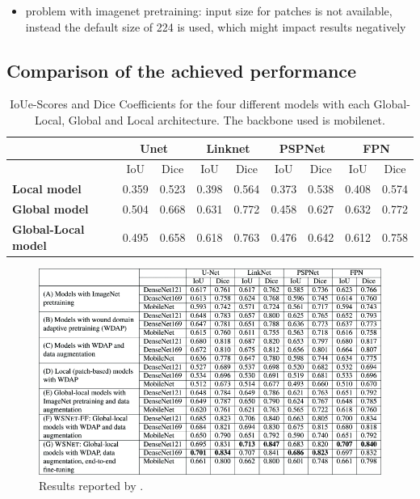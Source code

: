 \begin{itemize}
	\item problem with imagenet pretraining: input size for patches is not available, instead the default size of 224 is used, which might impact results negatively
\end{itemize}


\subsection{Comparison of the achieved performance}

\begin{table}[htb!]
	\centering
	\begin{tabular}{l||c | c | c | c | c | c | c | c|}
	& \multicolumn{2}{|c|}{Unet} & \multicolumn{2}{|c|}{Linknet} & \multicolumn{2}{|c|}{PSPNet} & \multicolumn{2}{|c|}{FPN} \\
	\hline
	& IoU & Dice & IoU & Dice & IoU & Dice & IoU & Dice \\
	\hline\hline
	\textbf{Local model} & 0.359 & 0.523 & 0.398 & 0.564 & 0.373 & 0.538 & 0.408 & 0.574 \\	
	\textbf{Global model} & 0.504 & 0.668 & 0.631 & 0.772 & 0.458 & 0.627 & 0.632 & 0.772 \\
	\textbf{Global-Local model} & 0.495 & 0.658 & 0.618 & 0.763 & 0.476 & 0.642 & 0.612 & 0.758\\
	\end{tabular}
	\caption{IoUe-Scores and Dice Coefficients for the four different models with each Global-Local, Global and Local architecture. The backbone used is mobilenet.}
\end{table}

\begin{figure}[htb!]
	\centering
	\includegraphics[width=\textwidth]{fig/wsnet-results.png}
	\caption{Results reported by \citeauthor{Oota_2023_WACV} \cite{Oota_2023_WACV}.}
\end{figure}

